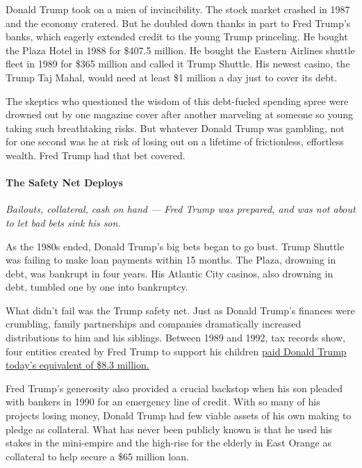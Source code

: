 Donald Trump took on a mien of invincibility. The stock market crashed
in 1987 and the economy cratered. But he doubled down thanks in part to
Fred Trump's banks, which eagerly extended credit to the young Trump
princeling. He bought the Plaza Hotel in 1988 for \$407.5 million. He
bought the Eastern Airlines shuttle fleet in 1989 for \$365 million and
called it Trump Shuttle. His newest casino, the Trump Taj Mahal, would
need at least \$1 million a day just to cover its debt.

The skeptics who questioned the wisdom of this debt-fueled spending
spree were drowned out by one magazine cover after another marveling at
someone so young taking such breathtaking risks. But whatever Donald
Trump was gambling, not for one second was he at risk of losing out on a
lifetime of frictionless, effortless wealth. Fred Trump had that bet
covered.

\hypertarget{the-safety-net-deploys}{%
\paragraph{The Safety Net Deploys}\label{the-safety-net-deploys}}

\emph{Bailouts, collateral, cash on hand --- Fred Trump was prepared,
and was not about to let bad bets sink his son.}

As the 1980s ended, Donald Trump's big bets began to go bust. Trump
Shuttle was failing to make loan payments within 15 months. The Plaza,
drowning in debt, was bankrupt in four years. His Atlantic City casinos,
also drowning in debt, tumbled one by one into bankruptcy.

What didn't fail was the Trump safety net. Just as Donald Trump's
finances were crumbling, family partnerships and companies dramatically
increased distributions to him and his siblings. Between 1989 and 1992,
tax records show, four entities created by Fred Trump to support his
children
\href{https://int.graylady3jvrrxbe.onion/data/documenthelper/341-djt-k1-1991-1993/2ed81084d70858cfbb17/optimized/full.pdf\#page=1}{paid
Donald Trump today's equivalent of \$8.3 million.}

Fred Trump's generosity also provided a crucial backstop when his son
pleaded with bankers in 1990 for an emergency line of credit. With so
many of his projects losing money, Donald Trump had few viable assets of
his own making to pledge as collateral. What has never been publicly
known is that he used his stakes in the mini-empire and the high-rise
for the elderly in East Orange as collateral to help secure a \$65
million loan.

